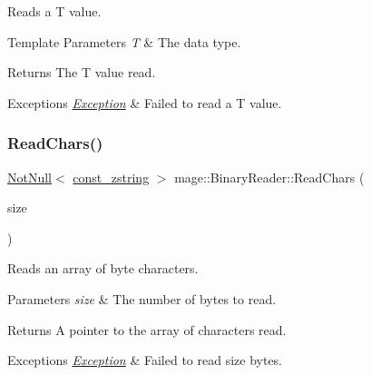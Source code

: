 Reads a {\ttfamily T} value.


\begin{DoxyTemplParams}{Template Parameters}
{\em T} & The data type. \\
\hline
\end{DoxyTemplParams}
\begin{DoxyReturn}{Returns}
The {\ttfamily T} value read. 
\end{DoxyReturn}

\begin{DoxyExceptions}{Exceptions}
{\em \mbox{\hyperlink{classmage_1_1_exception}{Exception}}} & Failed to read a {\ttfamily T} value. \\
\hline
\end{DoxyExceptions}
\mbox{\label{classmage_1_1_binary_reader_ad2bed0756a38358fc4a8b10b02007af8}} 
\subsubsection{\texorpdfstring{Read\+Chars()}{ReadChars()}}
{\footnotesize\ttfamily \mbox{\hyperlink{namespacemage_a8769f9d670d6b585ea306cb1062af94b}{Not\+Null}}$<$ \mbox{\hyperlink{namespacemage_abfd9206dc607ceb5d13ec68bf075a5c0}{const\+\_\+zstring}} $>$ mage\+::\+Binary\+Reader\+::\+Read\+Chars (\begin{DoxyParamCaption}\item[{size\+\_\+t}]{size }\end{DoxyParamCaption})\hspace{0.3cm}{\ttfamily [protected]}}

Reads an array of byte characters.


\begin{DoxyParams}{Parameters}
{\em size} & The number of bytes to read. \\
\hline
\end{DoxyParams}
\begin{DoxyReturn}{Returns}
A pointer to the array of characters read. 
\end{DoxyReturn}

\begin{DoxyExceptions}{Exceptions}
{\em \mbox{\hyperlink{classmage_1_1_exception}{Exception}}} & Failed to read {\ttfamily size} bytes. \\
\hline
\end{DoxyExceptions}
\mbox{\label{classmage_1_1_binary_reader_a67157828a9781644fb55bd7f3558f07c}} 
